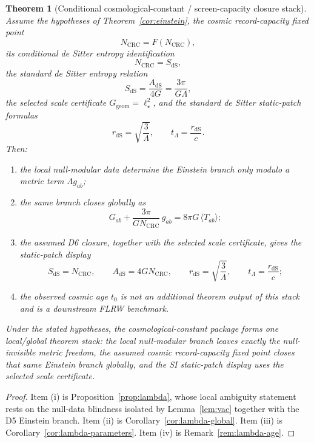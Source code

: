 \documentclass[11pt]{article}
\newtheorem{theorem}{Theorem}[section]
\begin{document}
\begin{theorem}[Conditional cosmological-constant / screen-capacity closure stack]\label{thm:lambda-stack}
Assume the hypotheses of Theorem~\ref{cor:einstein}, the cosmic record-capacity fixed point
\[
N_{\mathrm{CRC}}=F(N_{\mathrm{CRC}}),
\]
its conditional de Sitter entropy identification
\[
N_{\mathrm{CRC}}=S_{\mathrm{dS}},
\]
\noindent the standard de Sitter entropy relation
\[
S_{\mathrm{dS}}=\frac{A_{\mathrm{dS}}}{4G}=\frac{3\pi}{G\Lambda},
\]
the selected scale certificate \(G_{\mathrm{geom}}=\ell_\star^2\),
and the standard de Sitter static-patch formulas
\[
r_{\mathrm{dS}}=\sqrt{\frac{3}{\Lambda}},
\qquad
t_\Lambda=\frac{r_{\mathrm{dS}}}{c}.
\]
Then:
\begin{enumerate}[label=\textup{(\roman*)},leftmargin=2em]
\item the local null-modular data determine the Einstein branch only modulo a metric term \(\Lambda g_{ab}\);
\item the same branch closes globally as
\[
G_{ab}+\frac{3\pi}{G N_{\mathrm{CRC}}}\,g_{ab}=8\pi G\,\langle T_{ab}\rangle;
\]
\item the assumed D6 closure, together with the selected scale certificate, gives the static-patch display
\[
S_{\mathrm{dS}}=N_{\mathrm{CRC}},
\qquad
A_{\mathrm{dS}}=4G N_{\mathrm{CRC}},
\qquad
r_{\mathrm{dS}}=\sqrt{\frac{3}{\Lambda}},
\qquad
t_\Lambda=\frac{r_{\mathrm{dS}}}{c};
\]
\item the observed cosmic age \(t_0\) is not an additional theorem output of this stack and is a downstream FLRW benchmark.
\end{enumerate}
Under the stated hypotheses, the cosmological-constant package forms one local/global theorem stack:
the local null-modular branch leaves exactly the null-invisible metric freedom, the assumed cosmic
record-capacity fixed point closes that same Einstein branch globally, and the SI static-patch
display uses the selected scale certificate.
\end{theorem}

\begin{proof}
Item \textup{(i)} is Proposition~\ref{prop:lambda}, whose local ambiguity statement rests on the null-data blindness isolated by Lemma~\ref{lem:vac} together with the D5 Einstein branch. Item \textup{(ii)} is Corollary~\ref{cor:lambda-global}. Item \textup{(iii)} is Corollary~\ref{cor:lambda-parameters}. Item \textup{(iv)} is Remark~\ref{rem:lambda-age}.
\end{proof}
\end{document}
